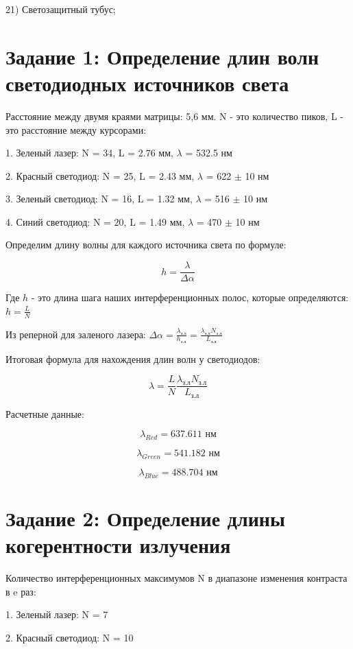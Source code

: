 \documentclass[12pt, a4paper]{report}
\begin{document}
21) Светозащитный тубус;

\newpage 

\section{Задание 1: Определение длин волн светодиодных источников света}

Расстояние между двумя краями матрицы: 5,6 мм. N - это количество пиков, L - это расстояние между курсорами:

1. Зеленый лазер: N = 34, L = 2.76 мм, \( \lambda \) = 532.5 нм

2. Красный светодиод: N = 25, L = 2.43 мм, \( \lambda \) = 622 \( \pm \) 10 нм

3. Зеленый светодиод: N = 16, L = 1.32 мм, \( \lambda \) = 516 \( \pm \) 10 нм

4. Синий светодиод: N = 20, L = 1.49 мм, \( \lambda \) = 470 \( \pm \) 10 нм

Определим длину волны для каждого источника света по формуле: 

\[ h = \frac{\lambda}{ \Delta \alpha }  \] 

Где \( h \)  - это длина шага  наших интерференционных полос, которые определяются: \( \displaystyle h = \frac{L}{N}  \) 

Из реперной для заленого лазера: \( \displaystyle \Delta \alpha = \frac{\lambda_{\text{з.л} }}{h _{\text{з.л} }}  = \frac{\lambda _{\text{з.л} }N_{\text{з.л} }  }{L _{\text{з.л} }}  \) 

Итоговая формула для нахождения длин волн у светодиодов: 

\[ \lambda = \frac{L }{N} \frac{\lambda _{\text{з.л} }N_{\text{з.л} }  } {L _{\text{з.л} }}\] 

Расчетные данные: 

\[ \lambda_{Red} = 637.611 \text{ нм}  \] 

\[ \lambda_{Green} = 541.182 \text{ нм}  \] 

\[ \lambda_{Blue} = 488.704 \text{ нм}  \] 

\section{Задание 2: Определение длины когерентности излучения}

Количество интерференционных максимумов N в диапазоне изменения контраста в e раз: 

1. Зеленый лазер: N = 7

2. Красный светодиод: N = 10
\end{document}

